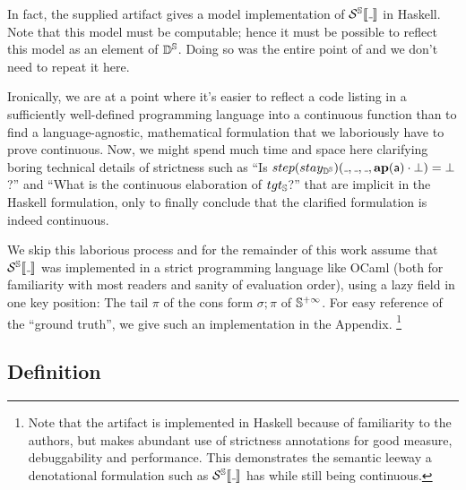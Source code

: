 In fact, the supplied artifact gives a model implementation of $\semst{\wild}$
in Haskell. Note that this model must be computable; hence it must be possible
to reflect this model as an element of ${\mathbb{D}^{\mathbb{S}}}$. Doing so was the entire point
of \citep{ScottStrachey:71} and we don't need to repeat it here.

Ironically, we are at a point where it's easier to reflect a code listing in a
sufficiently well-defined programming language into a continuous function than
to find a language-agnostic, mathematical formulation that we laboriously have
to prove continuous.
Now, we might spend much time and space here clarifying boring technical
details of strictness such as
``Is $step(stay_\StateD)(\wild,\wild,\wild,\ApplyF(\pa) \pushF \bot) = \bot$?''
and ``What is the continuous elaboration of $tgt_{\mathbb{S}}$?''
that are implicit in the Haskell formulation, only to finally conclude that the
clarified formulation is indeed continuous.

We skip this laborious process and for the remainder of this work assume that
$\semst{\wild}$ was implemented in a strict programming language like OCaml
(both for familiarity with most readers and sanity of evaluation order),
using a lazy field in one key position: The tail $π$ of the cons form $σ; π$ of
$\mathbb{S}^{+\infty}$. For easy reference of the ``ground truth'', we give such an
implementation in the Appendix.%
\footnote{Note that the artifact is implemented in Haskell because of
familiarity to the authors, but makes abundant use of strictness annotations
for good measure, debuggability and performance. This demonstrates the semantic
leeway a denotational formulation such as $\semst{\wild}$ has while still being
continuous.}

\subsection{Definition}

